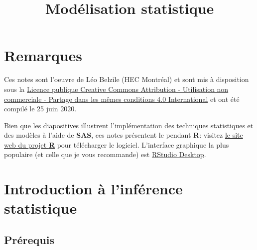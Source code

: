 \documentclass[
  11pt,
  letterpaper,
]{book}
\title{Modélisation statistique}
\author{}
\date{\vspace{-2.5em}}
\let\oldhref\href
\renewcommand{\href}[2]{#2\footnote{\url{#1}}}
\begin{document}
\maketitle

\let\href\oldhref

{
\setcounter{tocdepth}{1}
\tableofcontents
}
\hypertarget{remarques}{%
\chapter*{Remarques}\label{remarques}}

Ces notes sont l'oeuvre de Léo Belzile (HEC Montréal) et sont mis à disposition sous la \href{https://creativecommons.org/licenses/by-nc-sa/4.0/legalcode.fr}{Licence publique Creative Commons Attribution - Utilisation non commerciale - Partage dans les mêmes conditions 4.0 International} et ont été compilé le 25 juin 2020.

Bien que les diapositives illustrent l'implémentation des techniques statistiques et des modèles à l'aide de \textbf{SAS}, ces notes présentent le pendant \textbf{R}: visitez \href{https://cran.r-project.org/}{le site web du projet \textbf{R}} pour télécharger le logiciel. L'interface graphique la plus populaire (et celle que je vous recommande) est \href{https://www.rstudio.com/products/rstudio/download/}{RStudio Desktop}.

\newcommand{\bs}[1]{\boldsymbol{#1}}
\newcommand{\Hmat}{\mathbf{H}}
\newcommand{\Mmat}{\mathbf{M}}
\newcommand{\mX}{\mathbf{X}}
\newcommand{\bX}{{\mathbf{X}}}
\newcommand{\bx}{{\mathbf{x}}}
\newcommand{\by}{{\boldsymbol{y}}}
\newcommand{\bY}{{\boldsymbol{Y}}}
\newcommand{\eps}{\varepsilon}
\newcommand{\beps}{\boldsymbol{\varepsilon}}
\newcommand{\bbeta}{\boldsymbol{\beta}}
\newcommand{\hbb}{\widehat{\boldsymbol{\beta}}}
\newcommand{\limni}{\lim_{n \ra \infty}}
\newcommand{\Sp}{\mathscr{S}}
\newcommand{\Hy}{\mathscr{H}}
\newcommand{\pr}[2][]{{\mathsf P}_{#1}\left(#2\right)}
\newcommand{\E}[2][]{{\mathsf E}_{#1}\left(#2\right)}
\newcommand{\Va}[2][]{{\mathsf{Var}_{#1}}\left(#2\right)}
\newcommand{\I}[1]{{\mathbf 1}_{#1}}
\renewcommand{\d}{\mathrm{d}}

\hypertarget{intro}{%
\chapter{Introduction à l'inférence statistique}\label{intro}}

\hypertarget{pruxe9requis}{%
\section{Prérequis}\label{pruxe9requis}}
\end{document}
